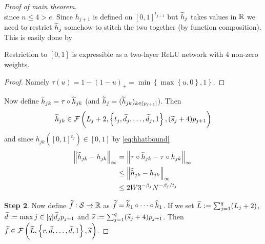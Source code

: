 \begin{proof}[Proof of main theorem]
\begin{equation}
  \end{equation} 
  since $n\leq 4 > e$.
  Since $h_{j+1}$ is defined on $[0, 1]^{t_{j+1}}$ but $\widetilde{h}_j$ takes values
  in $\mathbb{R}$ we need to restrict $\widetilde{h}_j$ somehow to stitch
  the two together (by function composition). This is easily done by
  \begin{lem}
    Restriction to $[0, 1]$ is expressible as a two-layer ReLU network
    with 4 non-zero weights.
  \end{lem}
  \begin{proof}
    Namely $\tau(u) = 1 - (1 - u)_+ = \min \left\{
    \max \left\{ u, 0 \right\}, 1 \right\}$. %
  \end{proof}
  Now define
  $\widetilde{h}_{jk} = \tau \circ \widehat{h}_{jk}$
  (and $\widetilde{h}_{j} = (\widetilde{h}_{jk})_{k \in [p_{j + 1}]}$).
  Then
  \begin{equation}
    \widetilde{h}_{jk} \in \mathcal{F}\left( L_j + 2, \left\{ t_j,
  \widetilde{d}_j, \dots, \widetilde{d}_j, 1 \right\}, (\widetilde{s}_j + 4) p_{j+1} \right)
  \end{equation}
  and since $h_{jk}([0, 1]^{t_j}) \in [0, 1]$ by \cref{eq:hhatbound}
  \begin{align}
    \norm{\widetilde{h}_{jk} - h_{jk}}_\infty
    = &\; \norm{\tau \circ \widehat{h}_{jk} - \tau \circ h_{jk}}_\infty
    \\ \leq &\; \norm{\widehat{h}_{jk} - h_{jk}}_\infty
    \\ \leq &\; 2 W 3^{-\beta_j} N^{-\beta_j/t_j}
  \end{align}

  \textbf{Step 2}.
  Now define $\widetilde{f}:\mathcal{S} \to \mathbb{R}$
  as $\widetilde{f} = \widetilde{h}_1 \circ \dots \circ \widehat{h}_1$.
  If we set
  $\widetilde{L} \vcentcolon= \sum_{j=1}^q (L_j + 2)$,
  $\widetilde{d} \vcentcolon= \max{j \in [q]} \widetilde{d}_j p_{j+1}$
  and $\widetilde{s} \vcentcolon= \sum_{j=1}^q (\widetilde{s}_j + 4) p_{j+1}$.
  Then $\widetilde{f} \in \mathcal{F}\left( \widetilde{L}, \left\{ 
  r, \widetilde{d}, \dots, \widetilde{d}, 1\right\}, \widetilde{s} \right)$.

\end{proof}
